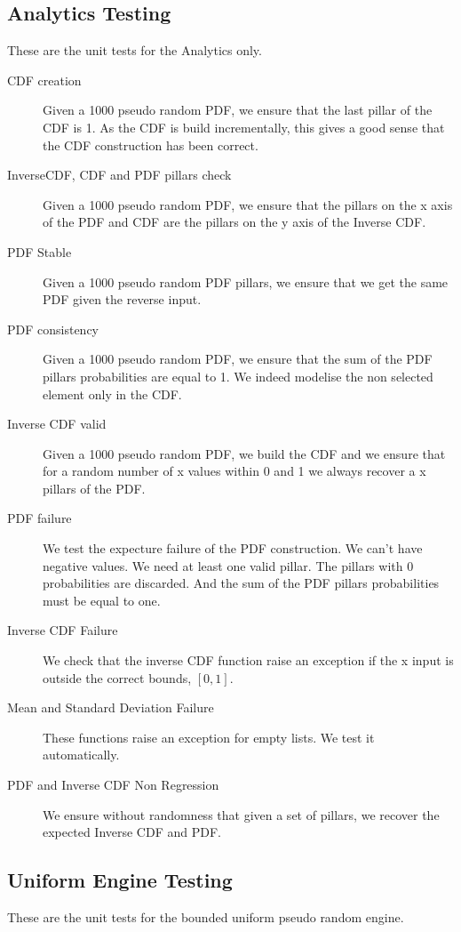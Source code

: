 \documentclass[12pt,a4paper,article]{memoir} %
\begin{document}
\subsection{Analytics Testing} 
These are the unit tests for the Analytics only.
\begin{description}
	\item [CDF creation]
		Given a 1000 pseudo random PDF, we ensure 
		that the last pillar of the CDF is 1.
		As the CDF is build incrementally, this gives a good sense that
		the CDF construction has been correct.
	\item [InverseCDF, CDF and PDF pillars check]
		Given a 1000 pseudo random PDF, we ensure that
		the pillars on the x axis of the PDF and CDF are the pillars on the y
		axis of the Inverse CDF.
	\item [PDF Stable]
		Given a 1000 pseudo random PDF pillars, 
		we ensure that we get the same PDF given the reverse input.
	\item [PDF consistency]
		Given a 1000 pseudo random PDF, 
		we ensure that the sum of the PDF pillars probabilities are 
		equal to 1. We indeed modelise the non selected element
		only in the CDF.
	\item [Inverse CDF valid]
		Given a 1000 pseudo random PDF,
		we build the CDF and we ensure that for a random number of
		x values within 0 and 1 we always recover a x pillars of the PDF.
	\item [PDF failure]
		We test the expecture failure of the PDF construction. 
		We can't have negative values. We need at least one valid pillar.
		The pillars with 0 probabilities are discarded.
		And the sum of the PDF pillars probabilities must be 
		equal to one.
	\item [Inverse CDF Failure]
		We check that the inverse CDF function raise an
		exception if the x input is outside the correct bounds, 
		$\left[0, 1\right]$.
	\item [Mean and Standard Deviation Failure]
		These functions raise an exception for empty lists.
		We test it automatically.
	\item [PDF and Inverse CDF Non Regression]
		We ensure without randomness that given a set of pillars,
		we recover the expected Inverse CDF and PDF.
\end{description}
\subsection{Uniform Engine Testing} 

These are the unit tests for the bounded uniform pseudo random engine.
	
\end{document}
